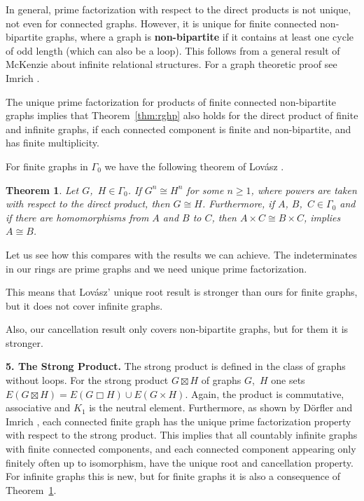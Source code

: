 \documentclass{amsart}
\theoremstyle{plain}
\newtheorem{theorem}[thm]{Theorem}
\theoremstyle{definition}
\newcommand{\defit}[1]{\textbf{#1}}
\begin{document}
In general, prime factorization with respect to the direct products is not unique, not even for connected graphs. However, it is unique for finite connected non-bipartite graphs, where a graph is \defit{non-bipartite} if it contains at least one cycle of odd length (which can also be a loop).
This follows from a general result of McKenzie \cite{mk1971} about infinite relational structures. For a graph theoretic proof see Imrich \cite{im1998}.

The unique prime factorization for products of finite connected non-bipartite graphs implies that Theorem~\ref{thm:rghp} also holds for the direct product of finite and infinite graphs, if each connected component is finite and non-bipartite, and has finite multiplicity.


For finite graphs in $\Gamma_0$ we have the following theorem of Lov\'asz \cite{lo1971}.

\begin{theorem}\label{thm:lo}
Let $G$,~$H \in \Gamma_0$. If $G^n \cong H^n$ for some $n \ge 1$, where
powers are taken with respect to the direct product, then $G\cong H$.
Furthermore, if $A$, $B$,~$C \in \Gamma_0$ and if there are
homomorphisms from $A$ and $B$ to $C$,  then
$A\times C\cong B\times C$, implies $A\cong B$.
\end{theorem}

Let us see how this compares with the results we can achieve. The indeterminates in our rings are prime graphs and we need unique prime factorization.


This means that Lov\'asz' unique root result is stronger than ours for finite graphs, but it does not cover infinite graphs.

Also, our cancellation result only covers non-bipartite graphs, but for them it is stronger.
\smallskip

\noindent
\textbf{5. The Strong Product.} The strong product is defined in the class of graphs without loops. For  the strong product $G\boxtimes H$ of  graphs $G$,~$H$ one sets $E(G\boxtimes H) = E(G\Box H) \cup E(G\times H)$. Again, the product is commutative, associative and $K_1$ is the neutral element. Furthermore, as shown by D{\"o}rfler and Imrich \cite{doim1970}, each connected finite graph has the unique prime factorization property with respect to the strong product. This implies that all countably infinite graphs with finite connected components, and each connected component appearing only finitely often up to isomorphism, have the unique root and cancellation property. For infinite graphs this is new, but for finite graphs it is also a consequence of Theorem~\ref{thm:lo}.
\end{document}
